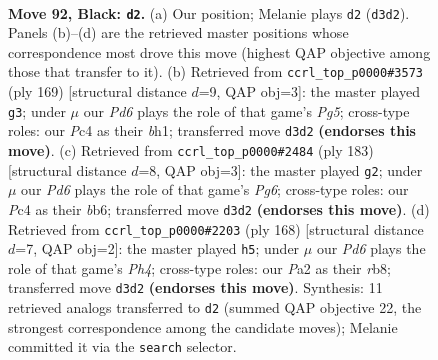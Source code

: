 \documentclass[11pt]{article}
\begin{document}
\clearpage

\begin{figure}[p]\centering
\begin{subfigure}{0.46\textwidth}\centering
\resizebox{\linewidth}{!}{%
\newchessgame
\chessboard[
  setfen={8/8/8/8/2p1k1K1/3p4/p7/8 b - - 3 92},
  showmover=false,
  pgfstyle=straightmove, color=movearrow, markmove={d3-d2}
]}
\caption{}
\end{subfigure}\hfill
\begin{subfigure}{0.46\textwidth}\centering
\resizebox{\linewidth}{!}{%
\newchessgame
\chessboard[
  setfen={8/8/8/8/3K1kp1/8/8/7B b - - 5 85},
  showmover=false,
  pgfstyle=straightmove, color=movearrow, markmove={g4-g3}
]}
\caption{}
\end{subfigure}
\\[4pt]
\begin{subfigure}{0.46\textwidth}\centering
\resizebox{\linewidth}{!}{%
\newchessgame
\chessboard[
  setfen={8/8/1B6/3p1b2/8/5kp1/8/4K3 b - - 17 92},
  showmover=false,
  pgfstyle=straightmove, color=movearrow, markmove={g3-g2}
]}
\caption{}
\end{subfigure}\hfill
\begin{subfigure}{0.46\textwidth}\centering
\resizebox{\linewidth}{!}{%
\newchessgame
\chessboard[
  setfen={1r6/6k1/R7/8/5P1P/7K/8/8 w - - 1 85},
  showmover=false,
  pgfstyle=straightmove, color=movearrow, markmove={h4-h5}
]}
\caption{}
\end{subfigure}
\caption{\textbf{Move 92, Black: \texttt{d2}.} (a) Our position; Melanie plays \texttt{d2} (\texttt{d3d2}). Panels (b)--(d) are the retrieved master positions whose correspondence most drove this move (highest QAP objective among those that transfer to it). (b) Retrieved from \texttt{ccrl\_top\_p0000\#3573} (ply 169) [structural distance $d$=9, QAP obj=3]: the master played \texttt{g3}; under $\mu$ our \emph{Pd6} plays the role of that game's \emph{Pg5}; cross-type roles: our \emph{P}c4 as their \emph{b}h1; transferred move \texttt{d3d2} \textbf{(endorses this move)}. (c) Retrieved from \texttt{ccrl\_top\_p0000\#2484} (ply 183) [structural distance $d$=8, QAP obj=3]: the master played \texttt{g2}; under $\mu$ our \emph{Pd6} plays the role of that game's \emph{Pg6}; cross-type roles: our \emph{P}c4 as their \emph{b}b6; transferred move \texttt{d3d2} \textbf{(endorses this move)}. (d) Retrieved from \texttt{ccrl\_top\_p0000\#2203} (ply 168) [structural distance $d$=7, QAP obj=2]: the master played \texttt{h5}; under $\mu$ our \emph{Pd6} plays the role of that game's \emph{Ph4}; cross-type roles: our \emph{P}a2 as their \emph{r}b8; transferred move \texttt{d3d2} \textbf{(endorses this move)}. Synthesis: 11 retrieved analogs transferred to \texttt{d2} (summed QAP objective 22, the strongest correspondence among the candidate moves); Melanie committed it via the \texttt{search} selector.}
\label{fig:thought-m183}
\end{figure}
\end{document}
